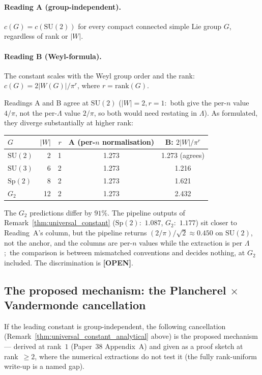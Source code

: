 \documentclass[11pt,a4paper]{article}
\theoremstyle{plain}
\theoremstyle{definition}
\newcommand{\Lammax}{\Lambda}
\newcommand{\SU}{\mathrm{SU}}
\newcommand{\Sp}{\mathrm{Sp}}
\begin{document}
\paragraph{Reading A (group-independent).}
$c(G) = c(\SU(2))$ for every compact connected simple Lie group $G$,
regardless of rank or $|W|$.

\paragraph{Reading B (Weyl-formula).}
The constant scales with the Weyl group order and the rank:
$c(G) = 2|W(G)|/\pi^r$, where $r = \mathrm{rank}(G)$.

Readings A and B agree at $\SU(2)$ ($|W| = 2, r = 1$:\ both give
the per-$n$ value $4/\pi$, not the per-$\Lammax$ value $2/\pi$, so both
would need restating in $\Lammax$). As formulated, they diverge
substantially at higher rank:

\begin{center}
\begin{tabular}{lrrcc}
\toprule
$G$ & $|W|$ & $r$ & A (per-$n$ normalisation) & B: $2|W|/\pi^r$ \\
\midrule
$\SU(2)$ & 2 & 1 & 1.273 & 1.273 (agrees) \\
$\SU(3)$ & 6 & 2 & 1.273 & 1.216 \\
$\Sp(2)$ & 8 & 2 & 1.273 & 1.621 \\
$G_2$ & 12 & 2 & 1.273 & 2.432 \\
\bottomrule
\end{tabular}
\end{center}

The $G_2$ predictions differ by $91\%$. The pipeline outputs of
Remark~\ref{thm:universal_constant} ($\Sp(2)$:\ $1.087$, $G_2$:\ $1.177$)
sit closer to Reading~A's column, but the pipeline returns
$(2/\pi)/\sqrt2 \approx 0.450$ on $\SU(2)$, not the anchor, and the
columns are per-$n$ values while the extraction is per $\Lammax$;\ the
comparison is between mismatched conventions and decides nothing, at
$G_2$ included. The discrimination is \textbf{[OPEN]}.

\subsection{The proposed mechanism: the Plancherel
$\times$ Vandermonde cancellation}\label{sec:why_universal}

If the leading constant is group-independent, the following cancellation
(Remark~\ref{thm:universal_constant_analytical} above) is the
proposed mechanism --- derived at rank~$1$ (Paper~38 Appendix~A) and
given as a proof sketch at rank~$\ge 2$, where the numerical extractions
do not test it (the fully rank-uniform write-up is a named gap).
\end{document}
